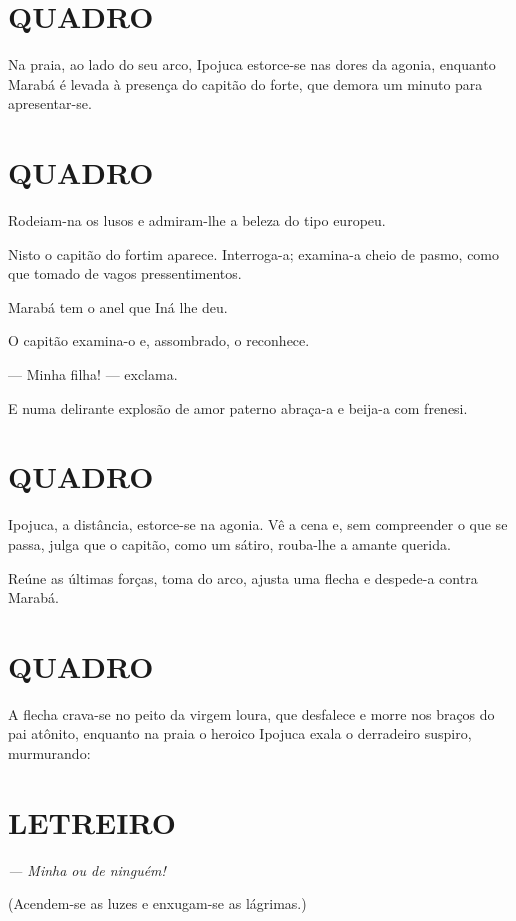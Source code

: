 \section{QUADRO}

Na praia, ao lado do seu arco, Ipojuca estorce-se nas dores da agonia,
enquanto Marabá é levada à presença do capitão do forte, que demora um
minuto para apresentar-se.

\section{QUADRO}

Rodeiam-na os lusos e admiram-lhe a beleza do tipo europeu.

Nisto o capitão do fortim aparece. Interroga-a; examina-a cheio de
pasmo, como que tomado de vagos pressentimentos.

Marabá tem o anel que Iná lhe deu.

O capitão examina-o e, assombrado, o reconhece.

--- Minha filha! --- exclama.

E numa delirante explosão de amor paterno abraça-a e beija-a com
frenesi.

\section{QUADRO}

Ipojuca, a distância, estorce-se na agonia. Vê a cena e, sem compreender
o que se passa, julga que o capitão, como um sátiro, rouba-lhe a amante
querida.

Reúne as últimas forças, toma do arco, ajusta uma flecha e despede-a
contra Marabá.

\section{QUADRO}

A flecha crava-se no peito da virgem loura, que desfalece e morre nos
braços do pai atônito, enquanto na praia o heroico Ipojuca exala o
derradeiro suspiro, murmurando:

\section{LETREIRO}

\emph{--- Minha ou de ninguém!}

(Acendem-se as luzes e enxugam-se as lágrimas.)

